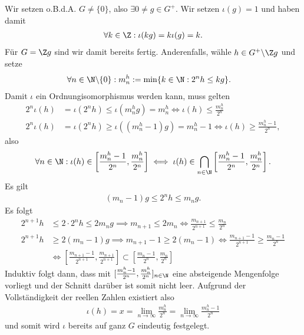 \begin{solution}
Wir setzen o.B.d.A. $G \neq \{0\}$, also $\exists 0 \neq g \in G^+$.
Wir setzen $\iota(g) = 1$ und haben damit
\begin{align*}
  \forall k \in \Z: \iota(kg) = k\iota(g) = k.
\end{align*}
Für $G = \Z g$ sind wir damit bereits fertig.
Anderenfalls, wähle $h \in G^+\backslash \Z g$ und setze
\begin{align*}
  \forall n \in \N\backslash \{0\}: m_n^h &:= \min\{k \in \N: 2^nh \leq kg\}.
\end{align*}
Damit $\iota$ ein Ordnungisomorphismus werden kann, muss gelten
\begin{align*}
  2^n \iota(h) &= \iota(2^nh) \leq \iota(m_n^hg) = m_n^h \iff \iota(h) \leq \frac{m_n^h}{2^n} \\
  2^n \iota(h) &= \iota(2^nh) \geq \iota((m_n^h - 1)g) = m_n^h - 1 \iff \iota(h) \geq \frac{m_n^h - 1}{2^n},
\end{align*}
also
\begin{align*}
  \forall n \in \N: \iota(h) \in \left[\frac{m_n^h-1}{2^n},\frac{m_n^h}{2^n}\right]
  \iff \iota(h) \in \bigcap_{n \in \N} \left[\frac{m_n^h-1}{2^n},\frac{m_n^h}{2^n}\right].
\end{align*}
Es gilt
\begin{align*}
  (m_n - 1)g \leq 2^nh \leq m_ng.
\end{align*}
Es folgt
\begin{align*}
  2^{n+1}h &\leq 2\cdot2^nh \leq 2 m_n g \implies m_{n+1} \leq 2m_n
  \iff \frac{m_{n+1}}{2^{n+1}} \leq \frac{m_n}{2^n} \\
  2^{n+1}h &\geq 2 (m_n - 1)g \implies m_{n+1} - 1 \geq 2 (m_n - 1)
  \iff \frac{m_{n+1}-1}{2^{n+1}} \geq \frac{m_n-1}{2^n}\\
  &\iff \left[\frac{m_{n+1} - 1}{2^{n+1}},\frac{m_{n+1}}{2^{n+1}}\right] \subset \left[\frac{m_{n} - 1}{2^{n}},\frac{m_{n}}{2^{n}}\right]
\end{align*}
Induktiv folgt dann, dass mit $[\frac{m_n^h-1}{2^n},\frac{m_n^h}{2^n}]_{n \in \N}$
eine absteigende Mengenfolge vorliegt und der Schnitt darüber ist somit nicht leer.
Aufgrund der Vollständigkeit der reellen Zahlen existiert also
\begin{align*}
  \iota(h) = x = \lim_{n \rightarrow \infty} \frac{m_n^h}{2^n} = \lim_{n \rightarrow \infty} \frac{m_n^h-1}{2^n}
\end{align*}
und somit wird $\iota$ bereits auf ganz $G$ eindeutig festgelegt. \\

\end{solution}
